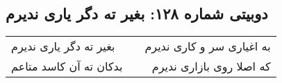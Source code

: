 \begin{center}
\section*{دوبیتی شماره ۱۲۸: بغیر ته دگر یاری ندیرم}
\label{sec:128}
\begin{longtable}{l p{0.5cm} r}
بغیر ته دگر یاری ندیرم
&&
به اغیاری سر و کاری ندیرم
\\
بدکان ته آن کاسد متاعم
&&
که اصلا روی بازاری ندیرم
\\
\end{longtable}
\end{center}
